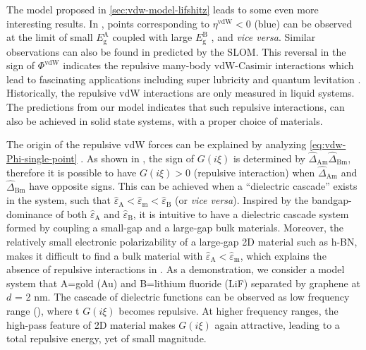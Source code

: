 The model proposed in \autoref{sec:vdw-model-lifshitz} leads to some
even more interesting results.
%
In , points corresponding to
\(\eta^{\mathrm{vdW}} < 0\) (blue) can be observed at the limit of
small \(E_{\mathrm{g}}^{\mathrm{A}}\) coupled with large
\(E_{\mathrm{g}}^{\mathrm{B}}\) , and \emph{vice versa}. Similar
observations can also be found in  predicted by
the SLOM.
%
This reversal in the sign of $\Phi^{\mathrm{vdW}}$ indicates the
repulsive many-body vdW-Casimir interactions
\cite{Munday_2009_repul,Zhao_2019_casimir_trap} which lead to
fascinating applications including super lubricity
\cite{Feiler_2008_superlubri} and quantum levitation
\cite{MUNDAY_2010_repul}.
%
Historically, the repulsive vdW interactions are only measured in
liquid systems. The predictions from our model
indicates that such repulsive interactions, can also be achieved in
solid state systems, with a proper choice of materials.

The origin of the repulsive vdW forces can be explained by analyzing
\autoref{eq:vdw-Phi-single-point} .
%
As shown in , the sign of $G(i \xi)$ is
determined by $\hat{\Delta}_{\mathrm{Am}} \hat{\Delta}_{\mathrm{Bm}}$,
therefore it is possible to have $G(i \xi) > 0$ (repulsive
interaction)  when
$\hat{\Delta}_{\mathrm{Am}}$ and $\hat{\Delta}_{\mathrm{Bm}}$ have
opposite signs.
%
This can be achieved when a ``dielectric cascade'' exists in the
system, such that
\(\hat{\varepsilon}_{\mathrm{A}} < \hat{\varepsilon}_{\mathrm{m}} <
\hat{\varepsilon}_{\mathrm{B}}\) (or \emph{vice versa}).
%
Inspired by the bandgap-dominance of both
\(\hat{\varepsilon}_{\mathrm{A}}\) and
\(\hat{\varepsilon}_{\mathrm{B}}\), it is intuitive to have a
dielectric cascade system formed by coupling a small-gap and a
large-gap bulk materials.
%
Moreover, the relatively small electronic polarizability of a
large-gap 2D material such as h-BN, makes it difficult to find a bulk
material with
\(\hat{\varepsilon}_{\mathrm{A}} < \hat{\varepsilon}_{\mathrm{m}}\),
which explains the absence of repulsive interactions in .
%
As a demonstration, we consider a model system
that A=gold (Au) and B=lithium fluoride (LiF) separated by graphene at \(d\)
= 2 nm.
%
The cascade of dielectric functions can be observed as low frequency
range (), where t
\(G(i \xi)\) becomes repulsive. At higher frequency ranges, the
high-pass feature of 2D material makes \(G(i \xi)\) again attractive,
leading to a total repulsive energy, yet of small magnitude.



